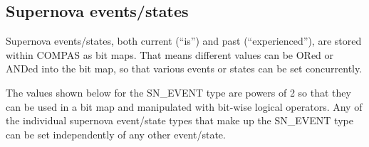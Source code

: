 



\newpage 
\subsection{Supernova events/states}\label{sec:SNEvents}

Supernova events/states, both current (``is'') and past (``experienced''), are stored within COMPAS as bit maps.  That means different values can be ORed or ANDed into the bit map, so that various events or states can be set concurrently.  

The values shown below for the SN\_EVENT type are powers of 2 so that they can be used in a bit map and manipulated with bit-wise logical operators.  Any of the individual supernova event/state types that make up the SN\_EVENT type can be set independently of any other event/state.

